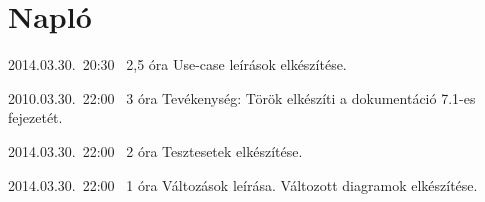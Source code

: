 %
\section{Napló}

\begin{naplo}

\bejegyzes
{2014.03.30.~20:30~} %
{2,5 óra} %
{\vadam} %
{Use-case leírások elkészítése.} %

\bejegyzes
{2010.03.30.~22:00~}
{3 óra}
{\vtorok}
{Tevékenység: Török elkészíti a dokumentáció 7.1-es fejezetét.}
  
\bejegyzes
{2014.03.30.~22:00~}
{2 óra}
{\vantal}
{Tesztesetek elkészítése.}

\bejegyzes
{2014.03.30.~22:00~}
{1 óra}
{\vbator}
{Változások leírása. Változott diagramok elkészítése.}

\end{naplo}

